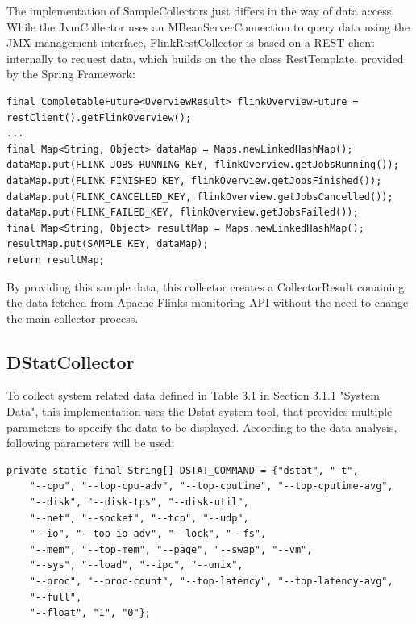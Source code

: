 The implementation of SampleCollectors just differs in the way of data access. While the JvmCollector uses an MBeanServerConnection
to query data using the JMX management interface, FlinkRestCollector is based on a REST client internally to request data, which builds
on the the class RestTemplate, provided by the Spring Framework:

\begin{lstlisting}[caption={"FlinkRestCollector" Rest client}, captionpos=b, label={lst:flink-rest-collector-client}]
final CompletableFuture<OverviewResult> flinkOverviewFuture = restClient().getFlinkOverview();
...
final Map<String, Object> dataMap = Maps.newLinkedHashMap();
dataMap.put(FLINK_JOBS_RUNNING_KEY, flinkOverview.getJobsRunning());
dataMap.put(FLINK_FINISHED_KEY, flinkOverview.getJobsFinished());
dataMap.put(FLINK_CANCELLED_KEY, flinkOverview.getJobsCancelled());
dataMap.put(FLINK_FAILED_KEY, flinkOverview.getJobsFailed());
final Map<String, Object> resultMap = Maps.newLinkedHashMap();
resultMap.put(SAMPLE_KEY, dataMap);
return resultMap;
\end{lstlisting}

By providing this sample data, this collector creates a CollectorResult conaining the data fetched from Apache Flinks monitoring
API without the need to change the main collector process.

\subsection{DStatCollector}

To collect system related data defined in Table 3.1 in Section 3.1.1 "System Data", this implementation uses the Dstat system tool,
that provides multiple parameters to specify the data to be displayed. According to the data analysis, following parameters will be used:

\begin{lstlisting}[caption={"DstatCollector" program parameters in }, captionpos=b, label={lst:dstat-parameters}]
private static final String[] DSTAT_COMMAND = {"dstat", "-t",
    "--cpu", "--top-cpu-adv", "--top-cputime", "--top-cputime-avg",
    "--disk", "--disk-tps", "--disk-util",
    "--net", "--socket", "--tcp", "--udp",
    "--io", "--top-io-adv", "--lock", "--fs",
    "--mem", "--top-mem", "--page", "--swap", "--vm",
    "--sys", "--load", "--ipc", "--unix",
    "--proc", "--proc-count", "--top-latency", "--top-latency-avg",
    "--full",
    "--float", "1", "0"};
\end{lstlisting}

